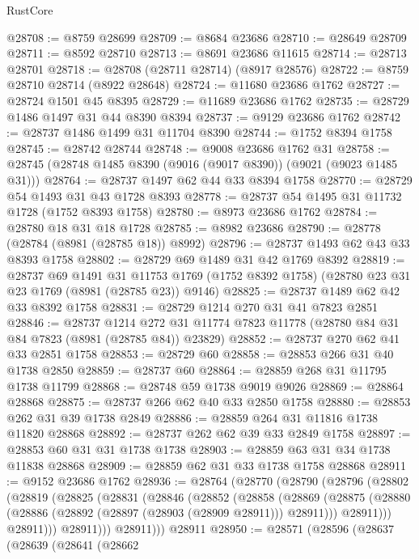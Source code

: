\begin{lexlean}{RustCore}
\begin{coremodule}
@28708 := @8759 @28699
@28709 := @8684 @23686
@28710 := @28649 @28709
@28711 := @8592 @28710
@28713 := @8691 @23686 @11615
@28714 := @28713 @28701
@28718 := @28708 (@28711 @28714) (@8917 @28576)
@28722 := @8759 @28710 @28714 (@8922 @28648)
@28724 := @11680 @23686 @1762
@28727 := @28724 @1501 @45 @8395
@28729 := @11689 @23686 @1762
@28735 := @28729 @1486 @1497 @31 @44 @8390 @8394
@28737 := @9129 @23686 @1762
@28742 := @28737 @1486 @1499 @31 @11704 @8390
@28744 := @1752 @8394 @1758
@28745 := @28742 @28744
@28748 := @9008 @23686 @1762 @31
@28758 := @28745 (@28748 @1485 @8390 (@9016 (@9017 @8390)) (@9021 (@9023 @1485 @31)))
@28764 := @28737 @1497 @62 @44 @33 @8394 @1758
@28770 := @28729 @54 @1493 @31 @43 @1728 @8393
@28778 := @28737 @54 @1495 @31 @11732 @1728 (@1752 @8393 @1758)
@28780 := @8973 @23686 @1762
@28784 := @28780 @18 @31 @18 @1728
@28785 := @8982 @23686
@28790 := @28778 (@28784 (@8981 (@28785 @18)) @8992)
@28796 := @28737 @1493 @62 @43 @33 @8393 @1758
@28802 := @28729 @69 @1489 @31 @42 @1769 @8392
@28819 := @28737
    @69
    @1491
    @31
    @11753
    @1769
    (@1752 @8392 @1758)
    (@28780 @23 @31 @23 @1769 (@8981 (@28785 @23)) @9146)
@28825 := @28737 @1489 @62 @42 @33 @8392 @1758
@28831 := @28729 @1214 @270 @31 @41 @7823 @2851
@28846 := @28737
    @1214
    @272
    @31
    @11774
    @7823
    @11778
    (@28780 @84 @31 @84 @7823 (@8981 (@28785 @84)) @23829)
@28852 := @28737 @270 @62 @41 @33 @2851 @1758
@28853 := @28729 @60
@28858 := @28853 @266 @31 @40 @1738 @2850
@28859 := @28737 @60
@28864 := @28859 @268 @31 @11795 @1738 @11799
@28868 := @28748 @59 @1738 @9019 @9026
@28869 := @28864 @28868
@28875 := @28737 @266 @62 @40 @33 @2850 @1758
@28880 := @28853 @262 @31 @39 @1738 @2849
@28886 := @28859 @264 @31 @11816 @1738 @11820 @28868
@28892 := @28737 @262 @62 @39 @33 @2849 @1758
@28897 := @28853 @60 @31 @31 @1738 @1738
@28903 := @28859 @63 @31 @34 @1738 @11838 @28868
@28909 := @28859 @62 @31 @33 @1738 @1758 @28868
@28911 := @9152 @23686 @1762
@28936 := @28764
    (@28770
      (@28790
        (@28796
          (@28802
            (@28819
              (@28825
                (@28831
                  (@28846
                    (@28852
                      (@28858
                        (@28869
                          (@28875
                            (@28880 (@28886 (@28892 (@28897 (@28903 (@28909 @28911))) @28911)))
                            @28911)))
                      @28911)))
                @28911)))
          @28911)))
    @28911
@28950 := @28571
    (@28596
      (@28637
        (@28639
          (@28641
            (@28662

\end{coremodule}
\end{lexlean}
